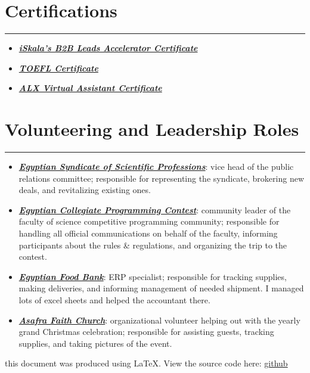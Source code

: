 \documentclass[10pt]{article}
\newcommand{\fancy}[1]{\Large\textbf{\textit{#1}}}
\begin{document}




\section*{Certifications}
\hrule
\vspace{1em}
\begin{itemize}
	\item \fancy{\href{https://drive.google.com/file/d/1UHhuuMiArMW_1hM4Z_n6Jjeq9fMcX5iZ/view?usp=sharing}{iSkala's B2B Leads Accelerator Certificate} \quad\quad}
	\item \fancy{\href{https://drive.google.com/file/d/1S9nyRJj5tY12hFw3_XthDpG-YLtbXHaj/view?usp=sharing}{TOEFL Certificate} \quad\quad}
	\item \fancy{\href{https://drive.google.com/file/d/1UHhuuMiArMW_1hM4Z_n6Jjeq9fMcX5iZ/view?usp=sharing}{ALX Virtual Assistant Certificate} \quad\quad}
\end{itemize}

\vspace{1em}

\section*{Volunteering and Leadership Roles}
\hrule
\vspace{1em}
\begin{itemize}
	\item \fancy{\href{https://www.linkedin.com/company/syndicate-of-scientific-professions-alexandria-نقابة-المهن-العلمية-الإسكندرية/}{Egyptian Syndicate of Scientific Professions}}: vice head of the public relations committee; responsible for representing the syndicate, brokering new deals, and revitalizing existing ones.
	\item \fancy{\href{https://www.linkedin.com/showcase/ecpc-egyptian-collegiate-programming-contest1/}{Egyptian Collegiate Programming Contest}}: community leader of the faculty of science competitive programming community; responsible for handling all official communications on behalf of the faculty, informing participants about the rules \& regulations, and organizing the trip to the contest.
	\item \fancy{\href{https://www.linkedin.com/company/egyptian-food-bank/}{Egyptian Food Bank}}: ERP specialist; responsible for tracking supplies, making deliveries, and informing management of needed shipment. I managed lots of excel sheets and helped the accountant there.
	\item \fancy{\href{https://www.linkedin.com/company/asafra-faith-church/}{Asafra Faith Church}}: organizational volunteer helping out with the yearly grand Christmas celebration; responsible for assisting guests, tracking supplies, and taking pictures of the event.
\end{itemize}

\begin{center}
	{\tiny this document was produced using \LaTeX. View the source code here: \href{https://github.com/aaamw2000/myLaTeX/tree/main/pii/myCV}{github}}
\end{center}
\end{document}
